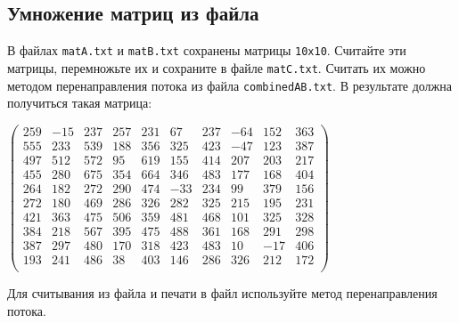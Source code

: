 \documentclass{article}
\begin{document}
\subsection{Умножение матриц из файла}
В файлах \texttt{matA.txt} и \texttt{matB.txt} сохранены матрицы \texttt{10x10}. Считайте эти матрицы, перемножьте их и сохраните в файле \texttt{matC.txt}. Считать их можно методом перенаправления потока из файла \texttt{combinedAB.txt}. В результате должна получиться такая матрица:
\begin{center}
$
\begin{pmatrix}
259 & -15 & 237 & 257 &  231 &  67  & 237  & -64  & 152  & 363 \\
555 & 233 & 539 & 188 &  356 &  325 &  423 &  -47 &  123 &  387 \\
497 & 512 & 572 & 95  & 619  & 155  & 414  & 207  & 203  & 217 \\
455 & 280 & 675 & 354 &  664 &  346 &  483 &  177 &  168 &  404 \\
264 & 182 & 272 & 290 &  474 &  -33 &  234 &  99  & 379  & 156 \\
272 & 180 & 469 & 286 &  326 &  282 &  325 &  215 &  195 &  231 \\
421 & 363 & 475 & 506 &  359 &  481 &  468 &  101 &  325 &  328 \\
384 & 218 & 567 & 395 &  475 &  488 &  361 &  168 &  291 &  298 \\
387 & 297 & 480 & 170 &  318 &  423 &  483 &  10  & -17  & 406 \\
193 & 241 & 486 & 38  & 403  & 146  & 286  & 326  & 212  & 172 \\
\end{pmatrix}
$
\end{center}
Для считывания из файла и печати в файл используйте метод перенаправления потока.
\end{document}
